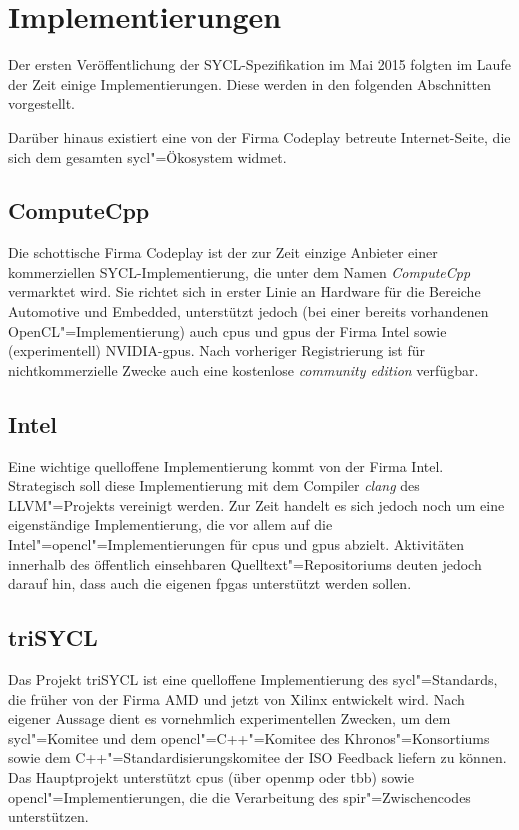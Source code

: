 \section{Implementierungen}\label{sycl:implementierungen}

Der ersten Veröffentlichung der SYCL-Spezifikation im Mai 2015 folgten im Laufe
der Zeit einige Implementierungen. Diese werden in den folgenden Abschnitten
vorgestellt.

Darüber hinaus existiert eine von der Firma Codeplay betreute Internet-Seite,
die sich dem gesamten \gls{sycl}"=Ökosystem widmet. \cite[vgl.][]{sycltech}

\subsection{ComputeCpp}

Die schottische Firma Codeplay ist der zur Zeit einzige Anbieter einer
kommerziellen SYCL-Implementierung, die unter dem Namen \textit{ComputeCpp}
vermarktet wird. Sie richtet sich in erster Linie an Hardware für die Bereiche
Automotive und Embedded, unterstützt jedoch (bei einer bereits vorhandenen
OpenCL"=Implementierung) auch \gls{cpu}s und \gls{gpu}s der Firma Intel sowie
(experimentell) NVIDIA-\gls{gpu}s. Nach vorheriger Registrierung ist für
nichtkommerzielle Zwecke auch eine kostenlose \textit{community edition}
verfügbar. \cite[vgl.][]{computecpp}

\subsection{Intel}

Eine wichtige quelloffene Implementierung kommt von der Firma Intel. Strategisch
soll diese Implementierung mit dem Compiler \textit{clang} des LLVM"=Projekts
vereinigt werden. Zur Zeit handelt es sich jedoch noch um eine eigenständige
Implementierung, die vor allem auf die Intel"=\gls{opencl}"=Implementierungen
für \gls{cpu}s und \gls{gpu}s abzielt. Aktivitäten innerhalb des öffentlich
einsehbaren Quelltext"=Repositoriums deuten jedoch darauf hin, dass auch die
eigenen \gls{fpga}s unterstützt werden sollen. \cite[vgl.][]{intelsycl}

\subsection{triSYCL}

Das Projekt triSYCL ist eine quelloffene Implementierung des
\gls{sycl}"=Standards, die früher von der Firma AMD und jetzt von Xilinx
entwickelt wird. Nach eigener Aussage dient es vornehmlich experimentellen
Zwecken, um dem \gls{sycl}"=Komitee und dem \gls{opencl}"=C++"=Komitee des
Khronos"=Konsortiums sowie dem C++"=Standardisierungskomitee der ISO Feedback
liefern zu können. Das Hauptprojekt unterstützt \gls{cpu}s (über \gls{openmp}
oder \gls{tbb}) sowie \gls{opencl}"=Implementierungen, die die Verarbeitung des
\gls{spir}"=Zwischencodes unterstützen. \cite[vgl.][]{trisycl}

